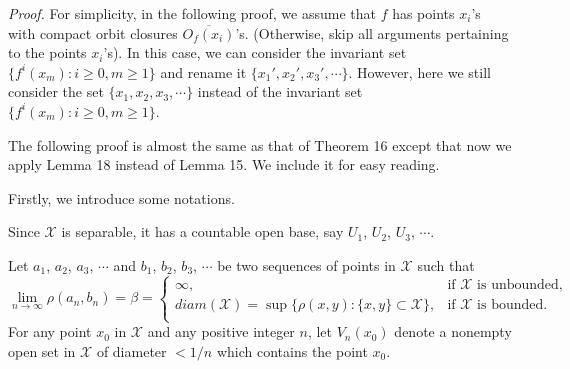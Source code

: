 \documentclass[12pt]{article}
\begin{document}
\noindent
{\it Proof.}
For simplicity, in the following proof, we assume that $f$ has points $x_i$'s with compact orbit closures $\overline{O_f(x_i)}$'s.  \big(Otherwise, skip all arguments pertaining to the points $x_i$'s\big).  In this case, we can consider the invariant set $\{ f^i(x_m): i \ge 0, m \ge 1 \}$ and rename it $\{ x_1', x_2', x_3', \cdots \}$.  However, here we still consider the set $\{ x_1, x_2, x_3, \cdots \}$ instead of the invariant set $\{ f^i(x_m): i \ge 0, m \ge 1 \}$.    

The following proof is almost the same as that of Theorem 16 except that now we apply Lemma 18 instead of Lemma 15.  We include it for easy reading.

Firstly, we introduce some notations.  

Since $\mathcal X$ is separable, it has a countable open base, say $U_1$, $U_2$, $U_3$, $\cdots$.  

Let $a_1$, $a_2$, $a_3$, $\cdots$ and $b_1$, $b_2$, $b_3$, $\cdots$ be two sequences of points in $\mathcal X$ such that
$$
\lim_{n \to \infty} \rho(a_n, b_n) = \beta = \begin{cases}
         \infty, & \text{if $\mathcal X$ is unbounded}, \\
         diam(\mathcal X) = \sup \big\{ \rho(x, y) : \{ x, y \} \subset \mathcal X \big\}, & \text{if $\mathcal X$ is bounded}. \\
         \end{cases}
$$ 
\indent For any point $x_0$ in $\mathcal X$ and any positive integer $n$, let $V_n(x_0)$ denote a nonempty open set in $\mathcal X$ of diameter $< 1/n$ which contains the point $x_0$.
 
\end{document}
